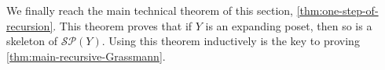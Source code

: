 \documentclass[10pt,a4paper]{article}
\newcommand{\prettyref}[1]{\cref{#1}}
\newtheorem{theorem}{Theorem}[section]
\theoremstyle{definition}
\theoremstyle{remark}
\newtheorem{remark}[theorem]{Remark}
\newcommand{\set}[1]{\{#1\}}
\renewcommand{\leq}{\leqslant}
\numberwithin{equation}{section}
\let\pref=\prettyref
\def\Y{Y}
\def\diml{d}
\def\dimlin{{\diml}}
\def\dimloutfull{{\diml'}}
\def\dimm{\ell}
\def\degree{D}
\def\M{\mathcal{SP}}
\begin{document}
%


We finally reach the main technical theorem of this section, \pref{thm:one-step-of-recursion}. This theorem proves that if \(Y\) is an expanding poset, then so is a skeleton of \(\M(Y)\). Using this theorem inductively is the key to proving \pref{thm:main-recursive-Grassmann}.
\end{document}
